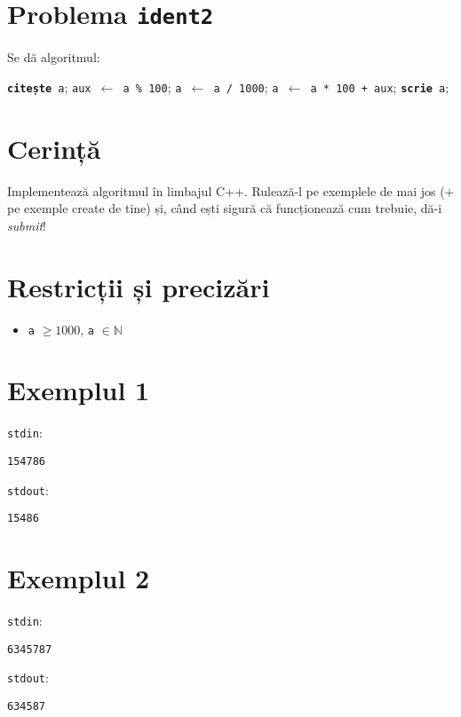 \documentclass{scrartcl}
\author{Temă Tutors of CNMB Informatică}
\date{\today}
\begin{document}
\section*{Problema \texttt{ident2}}
Se dă algoritmul:

\begin{algorithmic}[1]
    \State \texttt{\textbf{citește} a}; 
    \State \texttt{aux $\gets$ a \% 100};
    \State \texttt{a $\gets$ a / 1000};
    \State \texttt{a $\gets$ a * 100 + aux};
    \State \texttt{\textbf{scrie} a};
\end{algorithmic}

\section*{Cerință}
Implementează algoritmul în limbajul C++. Rulează-l pe exemplele de mai jos (+ pe exemple create de tine) și, când ești
sigură că funcționează cum trebuie, dă-i \textit{submit}!

\section*{Restricții și precizări}
\begin{itemize}
    \item \texttt{a} $\geq 1000$, \texttt{a} $\in \mathbb{N}$\texttt{}
\end{itemize}

{
\parindent0pt
    
\section*{Exemplul 1}
\texttt{stdin}:
    \begin{lstlisting}
154786
    \end{lstlisting}

\texttt{stdout}:
    \begin{lstlisting}
15486
    \end{lstlisting}

\section*{Exemplul 2}
\texttt{stdin}:
    \begin{lstlisting}
6345787
    \end{lstlisting}

\texttt{stdout}:
    \begin{lstlisting}
634587
    \end{lstlisting}
}
\end{document}
